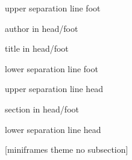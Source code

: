 \makeatletter
{}
  {%
    \begin{beamercolorbox}[colsep=1.5pt]{upper separation line foot}
    \end{beamercolorbox}
    \begin{beamercolorbox}[ht=2.5ex,dp=1.125ex,%
      leftskip=.3cm,rightskip=.3cm plus1fil]{author in head/foot}%
      \hfill%
      {\insertshortinstitute}%
    \end{beamercolorbox}%
    \begin{beamercolorbox}[ht=2.5ex,dp=1.125ex,%
      leftskip=.3cm,rightskip=.3cm plus1fil]{title in head/foot}%
      {\insertshorttitle}%
      \hfill%
      {\insertframenumber~\frameofframes~\inserttotalframenumber}
    \end{beamercolorbox}%
    \begin{beamercolorbox}[colsep=1.5pt]{lower separation line foot}
    \end{beamercolorbox}
  }
{%
  \begin{beamercolorbox}[colsep=1.5pt]{upper separation line head}
  \end{beamercolorbox}
  \begin{beamercolorbox}{section in head/foot}
    \vskip2pt\insertnavigation{\paperwidth}\vskip2pt
  \end{beamercolorbox}%
  \begin{beamercolorbox}[colsep=1.5pt]{lower separation line head}
  \end{beamercolorbox}
}

[miniframes theme no subsection]
\makeatother
